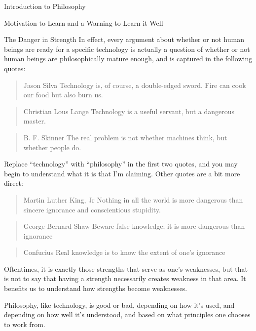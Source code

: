 \begin{chapter}{Introduction to Philosophy}
\begin{section}{Motivation to Learn and a Warning to Learn it Well}
\begin{subsection}{The Danger in Strength}
            In effect, every argument about whether or not human beings are ready for a specific technology is actually a question of whether or not human beings are philosophically mature enough, and is captured in the following quotes:
            
            \begin{quote}{Jason Silva}
                Technology is, of course, a double-edged sword. Fire can cook our food but also burn us.
            \end{quote}
            
            \begin{quote}{Christian Lous Lange}
                Technology is a useful servant, but a dangerous master.
            \end{quote}
            
            \begin{quote}{B. F. Skinner}
                The real problem is not whether machines think, but whether people do.
            \end{quote}
            
            Replace ``technology'' with ``philosophy'' in the first two quotes, and you may begin to understand what it is that I'm claiming. Other quotes are a bit more direct:
            
            \begin{quote}{Martin Luther King, Jr}
                Nothing in all the world is more dangerous than sincere ignorance and conscientious stupidity.
            \end{quote}
            
            \begin{quote}{George Bernard Shaw}
                Beware false knowledge; it is more dangerous than ignorance
            \end{quote}
            
            \begin{quote}{Confucius}
                Real knowledge is to know the extent of one’s ignorance
            \end{quote}
            
            Oftentimes, it is exactly those strengths that serve as one's weaknesses, but that is not to say that having a strength necessarily creates weakness in that area. It benefits us to understand how strengths become weaknesses. 
    
            Philosophy, like technology, is good or bad, depending on how it's used, and depending on how well it's understood, and based on what principles one chooses to work from.
                

\end{subsection}
\end{section}
\end{chapter}
